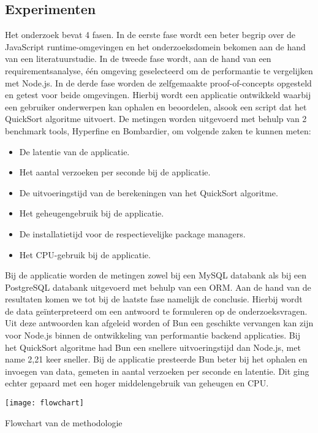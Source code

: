 \documentclass[a0,portrait]{hogent-poster}
\begin{document}
\begin{multicols}{2}
\section{Experimenten}
Het onderzoek bevat 4 fasen. 
In de eerste fase wordt een beter begrip over de JavaScript runtime-omgevingen en het onderzoeksdomein bekomen aan de hand van een literatuurstudie.
In de tweede fase wordt, aan de hand van een requirementsanalyse, één omgeving geselecteerd om de performantie te vergelijken met Node.js.
In de derde fase worden de zelfgemaakte proof-of-concepts opgesteld en getest voor beide omgevingen. 
Hierbij wordt een applicatie ontwikkeld waarbij een gebruiker onderwerpen kan ophalen en beoordelen, alsook een script dat het QuickSort algoritme uitvoert.
De metingen worden uitgevoerd met behulp van 2 benchmark tools, Hyperfine en Bombardier, om volgende zaken te kunnen meten:
\begin{itemize}
    \item De latentie van de applicatie.
    \item Het aantal verzoeken per seconde bij de applicatie.
    \item De uitvoeringstijd van de berekeningen van het QuickSort algoritme.
    \item Het geheugengebruik bij de applicatie.
    \item De installatietijd voor de respectievelijke package managers.
    \item Het CPU-gebruik bij de applicatie.
\end{itemize}
Bij de applicatie worden de metingen zowel bij een MySQL databank als bij een PostgreSQL databank uitgevoerd met behulp van een ORM.
Aan de hand van de resultaten komen we tot bij de laatste fase namelijk de conclusie. Hierbij wordt de data geïnterpreteerd om een antwoord te formuleren op de onderzoeksvragen.
Uit deze antwoorden kan afgeleid worden of Bun een geschikte vervangen kan zijn voor Node.js binnen de ontwikkeling van performantie backend applicaties.
Bij het QuickSort algoritme had Bun een snellere uitvoeringstijd dan Node.js, met name 2,21 keer sneller.
Bij de applicatie presteerde Bun beter bij het ophalen en invoegen van data, gemeten in aantal verzoeken per seconde en latentie.
Dit ging echter gepaard met een hoger middelengebruik van geheugen en CPU.
\begin{center}
  \captionsetup{type=figure}
  \begin{minipage}{0.23\textwidth}
    \centering
    \texttt{[image: flowchart]}
    \caption{Flowchart van de methodologie}

\end{minipage}
\end{center}
\end{multicols}
\end{document}
